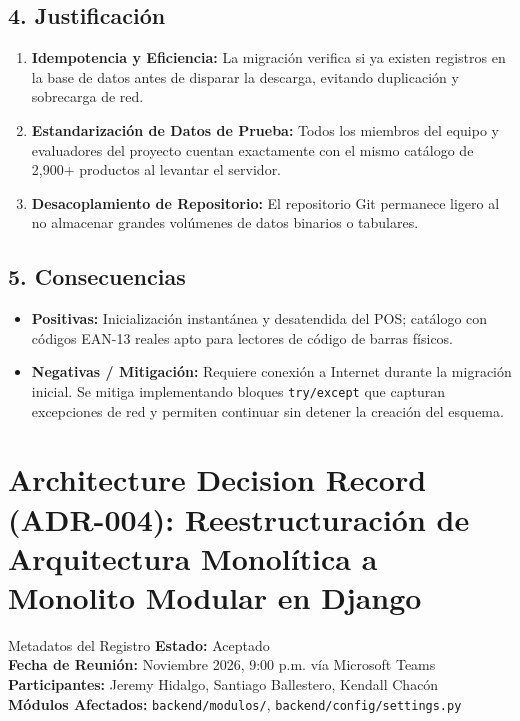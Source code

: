 \documentclass[11pt,a4paper]{article}
\begin{document}
\subsection{4. Justificación}
\begin{enumerate}
    \item \textbf{Idempotencia y Eficiencia:} La migración verifica si ya existen registros en la base de datos antes de disparar la descarga, evitando duplicación y sobrecarga de red.
    \item \textbf{Estandarización de Datos de Prueba:} Todos los miembros del equipo y evaluadores del proyecto cuentan exactamente con el mismo catálogo de 2,900+ productos al levantar el servidor.
    \item \textbf{Desacoplamiento de Repositorio:} El repositorio Git permanece ligero al no almacenar grandes volúmenes de datos binarios o tabulares.
\end{enumerate}

\subsection{5. Consecuencias}
\begin{itemize}[leftmargin=*]
    \item \textbf{Positivas:} Inicialización instantánea y desatendida del POS; catálogo con códigos EAN-13 reales apto para lectores de código de barras físicos.
    \item \textbf{Negativas / Mitigación:} Requiere conexión a Internet durante la migración inicial. Se mitiga implementando bloques \texttt{try/except} que capturan excepciones de red y permiten continuar sin detener la creación del esquema.
\end{itemize}

\newpage

\section{Architecture Decision Record (ADR-004): Reestructuración de Arquitectura Monolítica a Monolito Modular en Django}

\begin{adrbox}{Metadatos del Registro}
\textbf{Estado:} Aceptado \\
\textbf{Fecha de Reunión:} Noviembre 2026, 9:00 p.m. vía Microsoft Teams \\
\textbf{Participantes:} Jeremy Hidalgo, Santiago Ballestero, Kendall Chacón \\
\textbf{Módulos Afectados:} \texttt{backend/modulos/}, \texttt{backend/config/settings.py}
\end{adrbox}
\end{document}
